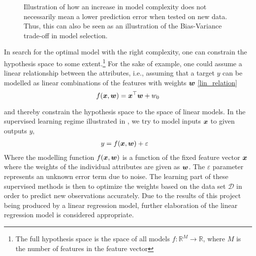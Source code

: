 \begin{figure}[t]
    \centering
    \iffigure
    \fi
    \caption[Model complexity vs prediction error]{Illustration of how an increase in model complexity does not necessarily mean a lower prediction error when tested on new data. Thus, this can also be seen as an illustration of the Bias-Variance trade-off in model selection.}
    \label{fig:model_complexity}
\end{figure}

In search for the optimal model with the right complexity, one can constrain the hypothesis space to some extent.\footnote{The full hypothesis space is the space of all models ${f:\mathbb{R}^M \to \mathbb{R}}$, where $M$ is the number of features in the feature vector} For the sake of example, one could assume a linear relationship between the attributes, i.e., assuming that a target $y$ can be modelled as linear combinations of the features with weights $\boldsymbol{w}$ \eqref{lin_relation} 
\begin{equation}\label{eq:lin_relation}
    f\qty(\bm{x},\boldsymbol{w})  =  \bm{x}^{\top} \boldsymbol{w}  +w_0 
\end{equation} 

and thereby constrain the hypothesis space to the space of linear models.
In the supervised learning regime illustrated in , we try to model inputs $\bm{x}$ to given outputs $y$, 
\begin{align}\label{eq:supervised_modelling}
    y&=f\qty(\bm{x},\boldsymbol{w}) + \varepsilon
\end{align}
Where the modelling function $f\qty(\bm{x},\boldsymbol{w})$ is a function of the fixed feature vector $\bm{x}$ where the weights of the individual attributes are given as $\boldsymbol{w}$. The $\varepsilon$ parameter represents an unknown error term due to noise. The learning part of these supervised methods is then to optimize the weights based on the data set $\mathcal{D}$ in order to predict new observations accurately. Due to the results of this project being produced by a linear regression model, further elaboration of the linear regression model is considered appropriate.

